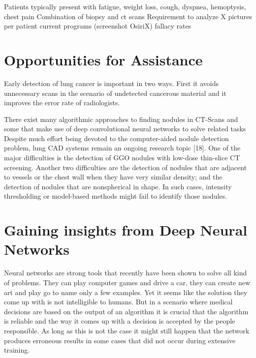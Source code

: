\documentclass[main.tex]{subfiles}
\begin{document}
Patients typically present with fatigue, weight loss, cough, dyspnea, hemoptysis, chest pain
Combination of biopsy and ct scans
Requirement to analyze X pictures per patient
current programs (screenshot OsiriX)
fallacy rates

\section{Opportunities for Assistance}

Early detection of lung cancer is important in two ways. First it avoids unnecessary scans in the scenario of undetected cancerous material and it improves the error rate of radiologists.

There exist many algorithmic approaches to finding nodules in CT-Scans \cite{papers_classical} and some that
make use of deep convolutional neural networks to solve related tasks \cite{papers_dnn}\\

Despite much effort being devoted to the computer-aided nodule detection problem, lung CAD systems remain an ongoing
research topic [18]. One of the major difficulties is the detection of GGO nodules with low-dose thin-slice CT screening. Another two difficulties are the detection of nodules that are adjacent to vessels or the chest wall when they have very similar density; and the detection of nodules that are nonspherical in shape. In such cases, intensity thresholding or model-based methods might fail to identify those nodules.

\section{Gaining insights from Deep Neural Networks}
Neural networks are strong tools that recently have been shown to solve all kind of problems. They can play
computer games and drive a car, they can create new art and play go to name only a few examples. Yet it seems like the solution they come up with is not intelligible to humans. But in a scenario where medical decisions are based on the output of an algorithm it is crucial that the algorithm is reliable and the way it comes up with a decision is accepted by the people responsible. As long as this is not the case it might still happen that the network produces erroneous results in some cases that did not occur during extensive training.
\end{document}
